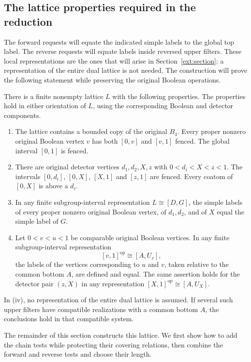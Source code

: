\subsection{The lattice properties required in the reduction}

The forward requests will equate the indicated simple labels to the
global top label.  The reverse requests will equate labels inside
reversed upper filters.  These local representations are the ones
that will arise in Section~\ref{ext:section}; a representation of the
entire dual lattice is not needed.  The construction will prove the
following statement while preserving the original Boolean operations.

\begin{proposition}
\label{lat:decorated-lattice}
There is a finite nonempty lattice $L$ with the following properties.
The properties hold in either orientation of $L$, using the
corresponding Boolean and detector components.
\begin{enumerate}[label=\textnormal{(\roman*)}]
\item The lattice contains a bounded copy of the original $B_4$.
  Every proper nonzero original Boolean vertex $v$ has both $[0,v]$
  and $[v,1]$ fenced.  The global interval $[0,1]$ is fenced.
\item There are original detector vertices $d_1,d_2,X,z$ with
  $0<d_i<X<z<1$.  The intervals $[0,d_i]$, $[0,X]$, $[X,1]$ and
  $[z,1]$ are fenced.  Every coatom of $[0,X]$ is above a $d_i$.
\item In any finite subgroup-interval representation $L\cong[D,G]$,
  the simple labels of every proper nonzero original Boolean vertex,
  of $d_1,d_2$, and of $X$ equal the simple label of $G$.
\item Let $0<v<u<1$ be comparable original Boolean vertices.  In any
  finite subgroup-interval representation
  \[
        [v,1]^{\mathrm{op}}\cong[A,U_v],
  \]
  the labels of the vertices corresponding to $u$ and $v$, taken
  relative to the common bottom $A$, are defined and equal.
  The same assertion holds for the detector pair $(z,X)$ in any
  representation $[X,1]^{\mathrm{op}}\cong[A,U_X]$.
\end{enumerate}
In (iv), no representation of the entire dual lattice is assumed.
If several such upper filters have compatible realizations with a
common bottom $A$, the conclusions hold in that compatible system.
\end{proposition}

The remainder of this section constructs this lattice.  We first show
how to add the chain tests while protecting their covering relations,
then combine the forward and reverse tests and choose their length.


